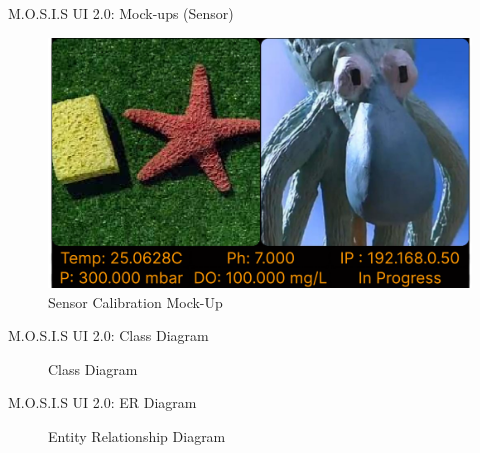 \documentclass[17pt, aspectratio=169]{beamer}
\begin{document}
\begin{frame}{M.O.S.I.S UI 2.0: Mock-ups (Sensor)}
	\begin{figure}
		\includegraphics[page=7,height=0.65\textheight]{../../Progress_Report_Document/Appendix/Design_Documentation/User_Interface/Figures/M.O.S.I.S_UI_Design.pdf}
		\caption{Sensor Calibration Mock-Up}
	\end{figure}
\end{frame}
\begin{frame}{M.O.S.I.S UI 2.0: Class Diagram}
	\begin{figure}
		\caption{Class Diagram}
	\end{figure}
\end{frame}
\begin{frame}{M.O.S.I.S UI 2.0: ER Diagram}
	\begin{figure}
		\caption{Entity Relationship Diagram}
	\end{figure}
\end{frame}
\end{document}
